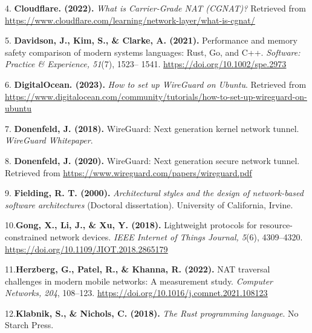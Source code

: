 \documentclass[12pt,a4paper,oneside]{report}
\begin{document}
4. \textbf{Cloudflare. (2022). }\textit{What is Carrier-Grade NAT (CGNAT)? }Retrieved from \href{https://www.cloudflare.com/learning/network-layer/what-is-cgnat/}{\uline{https://www.cloudflare.com/learning/network-layer/what-is-cgnat/}}


5. \textbf{Davidson, J., Kim, S., \& Clarke, A. (2021). }Performance and memory safety comparison of modern systems languages: Rust, Go, and C++. \textit{Software: Practice \& Experience, 51}(7), 1523-- 1541. \href{https://doi.org/10.1002/spe.2973}{\uline{https://doi.org/10.1002/spe.2973}}


6. \textbf{DigitalOcean. (2023). }\textit{How to set up WireGuard on Ubuntu}. Retrieved from \href{https://www.digitalocean.com/community/tutorials/how-to-set-up-wireguard-on-ubuntu}{\uline{https://www.digitalocean.com/community/tutorials/how-to-set-up-wireguard-on-ubuntu}}


7. \textbf{Donenfeld, J. (2018). }WireGuard: Next generation kernel network tunnel. \textit{WireGuard Whitepaper}.


8. \textbf{Donenfeld, J. (2020). }WireGuard: Next generation secure network tunnel. Retrieved from \href{https://www.wireguard.com/papers/wireguard.pdf}{\uline{https://www.wireguard.com/papers/wireguard.pdf}}


















9. \textbf{Fielding, R. T. (2000). }\textit{Architectural styles and the design of network-based software architectures }(Doctoral dissertation). University of California, Irvine.


10.\textbf{Gong, X., Li, J., \& Xu, Y. (2018). }Lightweight protocols for resource-constrained network devices. \textit{IEEE Internet of Things Journal, 5}(6), 4309--4320. \href{https://doi.org/10.1109/JIOT.2018.2865179}{\uline{https://doi.org/10.1109/JIOT.2018.2865179}}


11.\textbf{Herzberg, G., Patel, R., \& Khanna, R. (2022). }NAT traversal challenges in modern mobile networks: A measurement study. \textit{Computer} \textit{Networks, 204}, 108--123. \href{https://doi.org/10.1016/j.comnet.2021.108123}{\uline{https://doi.org/10.1016/j.comnet.2021.108123}}


12.\textbf{Klabnik, S., \& Nichols, C. (2018). }\textit{The Rust programming language}. No Starch Press.
\end{document}
